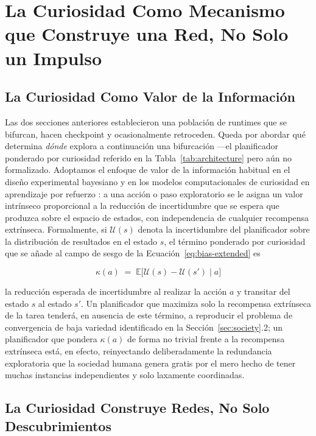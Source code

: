 \documentclass[11pt]{article}
\begin{document}
\section{La Curiosidad Como Mecanismo que Construye una Red, No Solo un Impulso}
\label{sec:curiosity}

\subsection{La Curiosidad Como Valor de la Información}

Las dos secciones anteriores establecieron una población de runtimes que se bifurcan, hacen checkpoint y ocasionalmente retroceden. Queda por abordar qué determina \emph{dónde} explora a continuación una bifurcación —el planificador ponderado por curiosidad referido en la Tabla~\ref{tab:architecture} pero aún no formalizado. Adoptamos el enfoque de valor de la información habitual en el diseño experimental bayesiano y en los modelos computacionales de curiosidad en aprendizaje por refuerzo \citep{schmidhuber2010formal, oudeyer2007intrinsic}: a una acción o paso exploratorio se le asigna un valor intrínseco proporcional a la reducción de incertidumbre que se espera que produzca sobre el espacio de estados, con independencia de cualquier recompensa extrínseca. Formalmente, si $\mathcal{U}(s)$ denota la incertidumbre del planificador sobre la distribución de resultados en el estado $s$, el término ponderado por curiosidad que se añade al campo de sesgo de la Ecuación~\ref{eq:bias-extended} es

\begin{equation}
\label{eq:curiosity}
\kappa(a) \;=\; \mathbb{E}\big[\mathcal{U}(s) - \mathcal{U}(s') \mid a\big]
\end{equation}

\noindent la reducción esperada de incertidumbre al realizar la acción $a$ y transitar del estado $s$ al estado $s'$. Un planificador que maximiza solo la recompensa extrínseca de la tarea tenderá, en ausencia de este término, a reproducir el problema de convergencia de baja variedad identificado en la Sección~\ref{sec:society}.2; un planificador que pondera $\kappa(a)$ de forma no trivial frente a la recompensa extrínseca está, en efecto, reinyectando deliberadamente la redundancia exploratoria que la sociedad humana genera gratis por el mero hecho de tener muchas instancias independientes y solo laxamente coordinadas.

\subsection{La Curiosidad Construye Redes, No Solo Descubrimientos}
\end{document}
